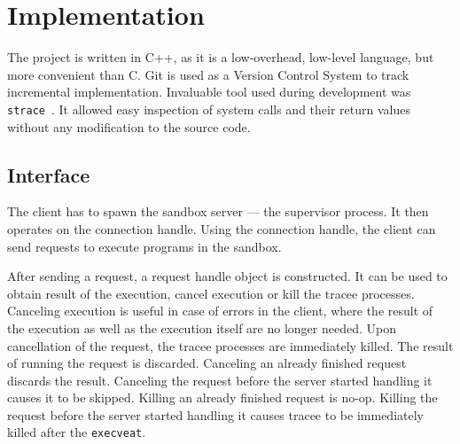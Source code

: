 \documentclass[en]{pracamgr}
\begin{document}
\chapter{Implementation}\label{chapter:implementation}

The project is written in C++, as it is a low-overhead, low-level language, but more convenient than C. Git is used as a Version Control System to track incremental implementation. Invaluable tool used during development was \texttt{strace}~\cite{strace}. It allowed easy inspection of system calls and their return values without any modification to the source code.

\section{Interface}

The client has to spawn the sandbox server --- the supervisor process. It then operates on the connection handle. Using the connection handle, the client can send requests to execute programs in the sandbox.

After sending a request, a request handle object is constructed. It can be used to obtain result of the execution, cancel execution or kill the tracee processes. Canceling execution is useful in case of errors in the client, where the result of the execution as well as the execution itself are no longer needed. Upon cancellation of the request, the tracee processes are immediately killed. The result of running the request is discarded. Canceling an already finished request discards the result. Canceling the request before the server started handling it causes it to be skipped. Killing an already finished request is no-op. Killing the request before the server started handling it causes tracee to be immediately killed after the \texttt{execveat}.
\end{document}
